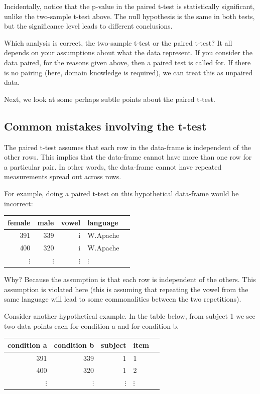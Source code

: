 \documentclass[12pt,]{krantz}
\begin{document}
Incidentally, notice that the p-value in the paired t-test is statistically significant, unlike the two-sample t-test above. The null hypothesis is the same in both tests, but the significance level leads to different conclusions.

Which analysis is correct, the two-sample t-test or the paired t-test? It all depends on your assumptions about what the data represent. If you consider the data paired, for the reasons given above, then a paired test is called for. If there is no pairing (here, domain knowledge is required), we can treat this as unpaired data.

Next, we look at some perhaps subtle points about the paired t-test.

\hypertarget{common-mistakes-involving-the-t-test}{%
\subsection{Common mistakes involving the t-test}\label{common-mistakes-involving-the-t-test}}

The paired t-test assumes that each row in the data-frame is independent of the other rows. This implies that the data-frame cannot have more than one row for a particular pair. In other words, the data-frame cannot have repeated measurements spread out across rows.

For example, doing a paired t-test on this hypothetical data-frame would be incorrect:

\begin{table}[ht]
\centering
\begin{tabular}{rrrll}
\hline
female & male & vowel & language \\ 
\hline
391 & 339 & i & W.Apache \\ 
400 & 320 & i & W.Apache \\ 
$\vdots$ & $\vdots$ & $\vdots$ & $\vdots$\\
\hline
\end{tabular}
\end{table}

Why? Because the assumption is that each row is independent of the others. This assumption is violated here (this is assuming that repeating the vowel from the same language will lead to some commonalities between the two repetitions).

Consider another hypothetical example. In the table below, from subject 1 we see two data points each for condition a and for condition b.

\begin{table}[ht]
\centering
\begin{tabular}{rrrll}
\hline
condition a & condition b & subject & item \\ 
\hline
391 & 339 & 1 & 1 \\ 
400 & 320 & 1 & 2 \\ 
$\vdots$ & $\vdots$ & $\vdots$ & $\vdots$\\
\hline
\end{tabular}
\end{table}
\end{document}
